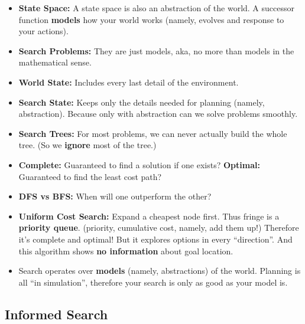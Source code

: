 \documentclass[twocolumn]{article}
\begin{document}
\begin{itemize}
\item \textbf{State Space:} A state space is also an abstraction of
  the world. A successor function \textbf{models} how your world
  works (namely, evolves and response to your actions). 
\item \textbf{Search Problems:} They are just models, aka, no more
  than models in the mathematical sense.
\item \textbf{World State:} Includes every last detail of the
  environment. 
\item \textbf{Search State:} Keeps only the details needed for
  planning (namely, abstraction). Because only with abstraction can we
  solve problems smoothly.
\item \textbf{Search Trees:} For most problems, we can never actually
  build the whole tree. (So we \textbf{ignore} most of the tree.)
\item \textbf{Complete:} Guaranteed to find a solution if one exists?
  \textbf{Optimal:} Guaranteed to find the least cost path?
\item \textbf{DFS vs BFS:} When will one outperform the other?
\item \textbf{Uniform Cost Search:} Expand a cheapest node first. Thus
  fringe is a \textbf{priority queue}. (priority, cumulative cost,
  namely, add them up!) Therefore it's complete and optimal! But it
  explores options in every ``direction''. And this algorithm shows
  \textbf{no information} about goal location.
\item Search operates over \textbf{models} (namely, abstractions) of
  the world. Planning is all ``in simulation'', therefore your search
  is only as good as your model is.
\end{itemize}

\subsection{Informed Search}
\label{sec:informed-search}
\end{document}
